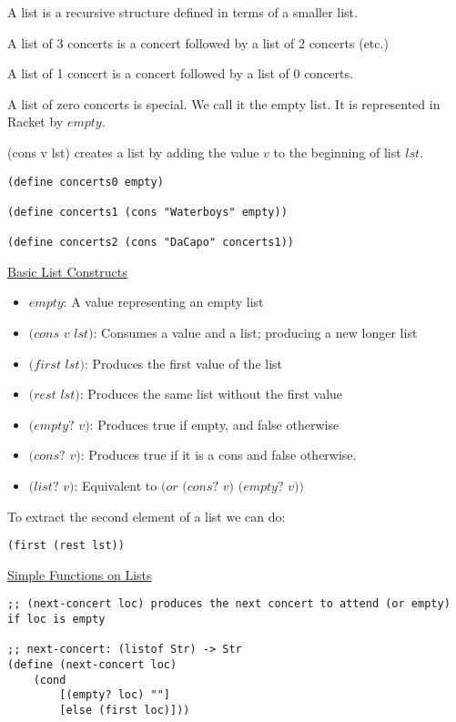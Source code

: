 \documentclass{article}
\begin{document}
A list is a recursive structure defined in terms of a smaller list. 

A list of 3 concerts is a concert followed by a list of 2 concerts (etc.)

A list of 1 concert is a concert followed by a list of 0 concerts. 

A list of zero concerts is special. We call it the empty list. It is represented in Racket by $empty$. 

(cons v lst) creates a list by adding the value $v$ to the beginning of list $lst$.

\begin{lstlisting}
(define concerts0 empty)

(define concerts1 (cons "Waterboys" empty))

(define concerts2 (cons "DaCapo" concerts1))
\end{lstlisting}

\underline{Basic List Constructs}
\begin{itemize}
    \item $empty$: A value representing an empty list
    \item $(cons$ $v$ $lst)$: Consumes a value and a list; producing a new longer list
    \item $(first$ $lst)$: Produces the first value of the list
    \item $(rest$ $lst)$: Produces the same list without the first value
    \item $(empty?$ $v)$: Produces true if empty, and false otherwise
    \item $(cons?$ $v)$: Produces true if it is a cons and false otherwise. 
    \item $(list?$ $v)$: Equivalent to $(or$ $(cons?$ $v)$ $(empty?$ $v))$
\end{itemize}

To extract the second element of a list we can do:
\begin{lstlisting}
(first (rest lst))
\end{lstlisting}

\underline{Simple Functions on Lists}

\begin{lstlisting}
;; (next-concert loc) produces the next concert to attend (or empty) if loc is empty

;; next-concert: (listof Str) -> Str
(define (next-concert loc)
    (cond
        [(empty? loc) ""]
        [else (first loc)]))
\end{lstlisting}
\end{document}
